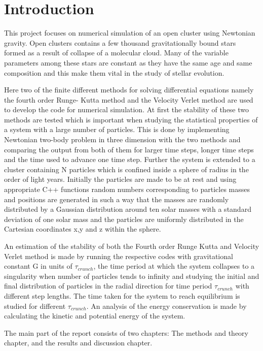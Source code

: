 \chapter{Introduction}
This project focuses on numerical simulation of an open cluster using Newtonian gravity. Open clusters contains a few thousand gravitationally bound stars formed as a result of collapse of a molecular cloud. Many of the variable parameters among these stars are constant as they have the same age and same composition and this make them vital in the study of stellar evolution. 

Here two of the finite different methods for solving differential equations namely the fourth order Runge- Kutta method and the Velocity Verlet method are used to develop the code for numerical simulation. At first the stability of these two methods are tested which is important when studying the statistical properties of a system with a large number of particles. This is done by implementing Newtonian two-body problem in three dimension with the two methods and comparing the output from both of them for larger time steps, longer time steps and the time used to advance one time step. Further the system is extended to a cluster containing N particles which is confined inside a sphere of radius in the order of light years. Initially the particles are made to be at rest and using appropriate C++ functions random numbers corresponding to particles masses and positions are generated in such a way that the masses are randomly distributed by a Gaussian distribution around ten solar masses with a standard deviation of one solar mass and the particles are uniformly distributed in the Cartesian coordinates x,y and z within the sphere. 

An estimation of the stability of both the Fourth order Runge Kutta and Velocity Verlet method is made by running the respective codes with gravitational constant G in units of $\tau_{crunch}$, the time period at which the system collapses to a singularity when number of particles tends to infinity and studying the initial and final distribution of particles in the radial direction for time period $\tau_{crunch}$ with different step lengths. The time taken for the system to reach equilibrium is studied for different $\tau_{crunch}$. An analysis of the energy conservation is made by calculating the kinetic and potential energy of the system. 
 


The main part of the report consists of two chapters: The methods and theory chapter, and the results and discussion chapter.